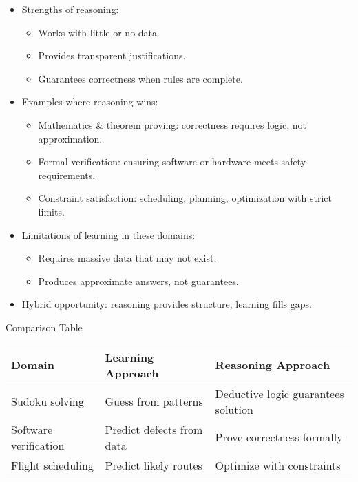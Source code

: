 \documentclass[
  letterpaper,
  DIV=11,
  numbers=noendperiod]{scrreprt}
\providecommand{\tightlist}{%
  \setlength{\itemsep}{0pt}\setlength{\parskip}{0pt}}
\begin{document}
\begin{itemize}
\item
  Strengths of reasoning:

  \begin{itemize}
  \tightlist
  \item
    Works with little or no data.
  \item
    Provides transparent justifications.
  \item
    Guarantees correctness when rules are complete.
  \end{itemize}
\item
  Examples where reasoning wins:

  \begin{itemize}
  \tightlist
  \item
    Mathematics \& theorem proving: correctness requires logic, not
    approximation.
  \item
    Formal verification: ensuring software or hardware meets safety
    requirements.
  \item
    Constraint satisfaction: scheduling, planning, optimization with
    strict limits.
  \end{itemize}
\item
  Limitations of learning in these domains:

  \begin{itemize}
  \tightlist
  \item
    Requires massive data that may not exist.
  \item
    Produces approximate answers, not guarantees.
  \end{itemize}
\item
  Hybrid opportunity: reasoning provides structure, learning fills gaps.
\end{itemize}

Comparison Table

\begin{longtable}[]{@{}
  >{\raggedright\arraybackslash}p{}
  >{\raggedright\arraybackslash}p{}
  >{\raggedright\arraybackslash}p{}@{}}
\toprule\noalign{}
\begin{minipage}[b]{\linewidth}\raggedright
Domain
\end{minipage} & \begin{minipage}[b]{\linewidth}\raggedright
Learning Approach
\end{minipage} & \begin{minipage}[b]{\linewidth}\raggedright
Reasoning Approach
\end{minipage} \\
\midrule\noalign{}
\endhead
\bottomrule\noalign{}
\endlastfoot
Sudoku solving & Guess from patterns & Deductive logic guarantees
solution \\
Software verification & Predict defects from data & Prove correctness
formally \\
Flight scheduling & Predict likely routes & Optimize with constraints \\
\end{longtable}
\end{document}
